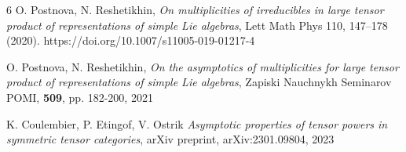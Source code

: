 \documentclass[11pt]{amsart}
\begin{document}
\begin{thebibliography}{6}
 O. Postnova, N. Reshetikhin, {\it On multiplicities of irreducibles in large tensor product of representations of simple Lie algebras}, Lett Math Phys 110, 147–178 (2020). https://doi.org/10.1007/s11005-019-01217-4

 O. Postnova, N. Reshetikhin, {\it On the asymptotics of multiplicities for large tensor product of representations of simple Lie algebras}, Zapiski Nauchnykh Seminarov POMI, {\bf 509}, pp. 182-200, 2021

 K. Coulembier, P. Etingof, V. Ostrik {\it Asymptotic properties of tensor powers in symmetric tensor categories}, arXiv preprint, arXiv:2301.09804, 2023


\end{thebibliography}  
 
\end{document}
